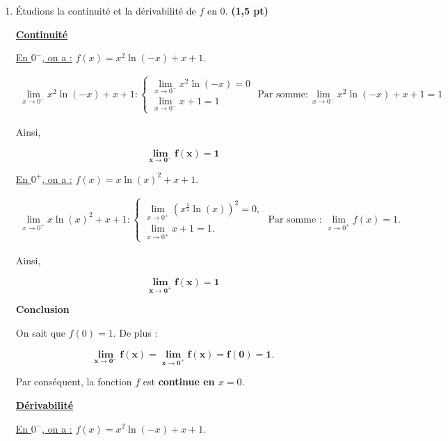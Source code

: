 \documentclass[12pt,a4paper]{article}
\begin{document}
\begin{enumerate}
\item Étudions la continuité et la dérivabilité de \( f \) en 0. \hfill \textbf{(1,5 pt)}

\underline{\textbf{Continuité}}

\underline{En \( 0^- \), on a :} \( f(x) = x^2 \ln(-x) + x + 1. \)

\(
\begin{aligned}
     \lim\limits_{x \to 0^-}x^2 \ln(-x) + x + 1:
    \begin{cases}
        \lim\limits_{x \to 0^-}x^2 \ln(-x)=0 \\
       \lim\limits_{x \to 0^-} x + 1 =1
    \end{cases}\text{ Par somme}: \lim\limits_{x \to 0^-}x^2 \ln(-x) + x + 1 = 1
\end{aligned}
\)

Ainsi,
\begin{resultbox}
    \[
        \mathbf{\lim\limits_{x \to 0^-} f(x) = 1}
    \]
\end{resultbox} 

\underline{En \( 0^+ \), on a :} \( f(x) = x \ln(x)^2 + x + 1. \)

\(
\begin{aligned}
    \lim\limits_{x \to 0^+} x \ln(x)^2 + x + 1:
    \begin{cases}
        \lim\limits_{x \to 0^+} (x^{\frac{1}{2}} \ln(x))^2 = 0, \\
        \lim\limits_{x \to 0^+} x + 1 = 1.
    \end{cases}
    \text{ Par somme : } \lim\limits_{x \to 0^+} f(x) = 1.
\end{aligned}
\)

Ainsi,

\begin{resultbox}
    \[
        \mathbf{\lim\limits_{x \to 0^+} f(x) = 1}
    \]
\end{resultbox} 

\textbf{  Conclusion }

On sait que \( f(0) = 1 \). De plus :

\begin{resultbox}
    \[
        \mathbf{\lim\limits_{x \to 0^-} f(x) = \lim\limits_{x \to 0^+} f(x) = f(0) = 1.
        }
    \]
\end{resultbox} 

Par conséquent, la fonction \( f \) est \textbf{continue en \( x = 0 \)}.

\underline{\textbf{Dérivabilité}}

\underline{En \( 0^- \), on a :} \( f(x) = x^2 \ln(-x) + x + 1. \)


\end{enumerate}
\end{document}
